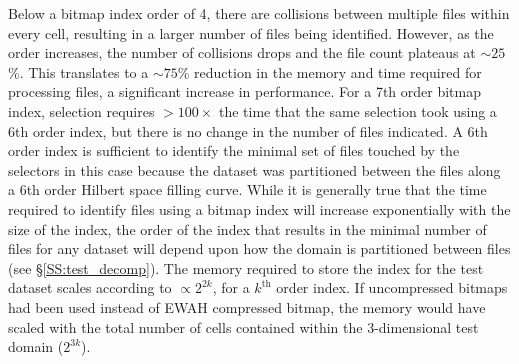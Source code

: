 \documentclass[apjl]{emulateapj}
\begin{document}
Below a bitmap index order of 4, there are collisions between multiple files within every cell, resulting in a larger number of files being identified. However, as the order increases, the number of collisions drops and the file count plateaus at $\sim25$\%. This translates to a $\sim75$\% reduction in the memory and time required for processing files, a significant increase in performance. For a 7th order bitmap index, selection requires $>100\times$ the time that the same selection took using a 6th order index, but there is no change in the number of files indicated. A 6th order index is sufficient to identify the minimal set of files touched by the selectors in this case because the dataset was partitioned between the files along a 6th order Hilbert space filling curve. While it is generally true that the time required to identify files using a bitmap index will increase exponentially with the size of the index, the order of the index that results in the minimal number of files for any dataset will depend upon how the domain is partitioned between files (see \S\ref{SS:test_decomp}). The memory required to store the index for the test dataset scales according to $\propto2^{2k}$, for a $k^{\mbox{th}}$ order index. If uncompressed bitmaps had been used instead of EWAH compressed bitmap, the memory would have scaled with the total number of cells contained within the 3-dimensional test domain ($2^{3k}$).

\end{document}
